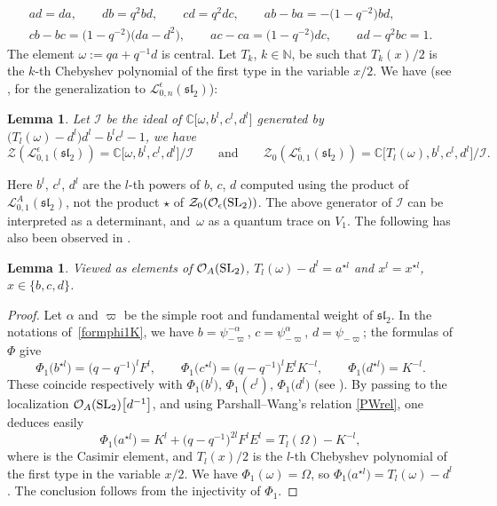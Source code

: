 \documentclass[10pt,a4paper]{amsart}
\numberwithin{equation}{section}
\newtheorem{lem}[teo]{Lemma}
\theoremstyle{definition}
\newcommand{\e}{\epsilon}
\newcommand{\mc}{\mathbb{C}}
\newcommand{\mn}{\mathbb{N}}
\newcommand{\Ll}{{\mathcal L}}
\newcommand{\Oo}{{\mathcal O}}
\begin{document}
\begin{gather}
ad=da ,\qquad db = q^2 bd, \qquad cd = q^2dc, \qquad
 ab-ba = -\big(1-q^{-2}\big)bd,\nonumber \\ cb-bc = \big(1-q^{-2}\big)\big(da-d^2\big),\qquad ac-ca=\big(1-q^{-2}\big)dc,\qquad ad-q^2bc=1. \label{rel01}
\end{gather}
The element $\omega:=qa+q^{-1}d$ is central. Let $T_k$, $k\in \mn$, be such that $T_k(x)/2$ is the $k$-th Chebyshev polynomial of the first type in the variable $x/2$. We have (see \cite[Proposition 7.2]{BR}, for the generalization to $\Ll_{0,n}^\e({\mathfrak{sl}_2})$):
\begin{lem}\label{L01sl2} Let $\mathcal{I}$ be the ideal of $\mc\big[\omega,b^l,c^l,d^l\big]$ generated by $\big(T_l(\omega)-d^l\big)d^l-b^lc^l-1$, we have
\[
\mathcal{Z}(\Ll_{0,1}^\e({\mathfrak{sl}_2})) = \mc\big[\omega,b^l,c^l,d^l\big]/\mathcal{I}\qquad \text{and} \qquad \mathcal{Z}_0(\Ll_{0,1}^\e({\mathfrak{sl}_2})) = \mc\big[T_l(\omega),b^l,c^l,d^l\big]/\mathcal{I}.
\]
\end{lem}
Here $b^l$, $c^l$, $d^l$ are the $l$-th powers of $b$, $c$, $d$ computed using the product of $\Ll_{0,1}^A({\mathfrak{sl}_2})$, not the product $\star$ of $\mathcal{Z}_0(\Oo_\e({\rm SL}_2))$. The above generator of $\mathcal{I}$ can be interpreted as a determinant, and~$\omega$ as a quantum trace on $V_1$. The following has also been observed in \cite{KQ}.

\begin{lem}\label{identZF} Viewed as elements of $\Oo_A({\rm SL}_2)$, $T_l(\omega)-d^l = a^{\star l}$ and $x^l = x^{\star l}$, $x\in \{b,c,d\}$.
\end{lem}
\begin{proof} Let $\alpha$ and $\varpi$ be the simple root and fundamental weight of ${\mathfrak{sl}_2}$. In the notations of~\eqref{formphi1K}, we have $b = \psi^{-\alpha}_{-\varpi}$, $c=\psi^\alpha_{-\varpi}$, $d=\psi_{-\varpi}$; the formulas of $\Phi$ give
\[
\Phi_1\big(b^{\star l}\big) = \big(q-q^{-1}\big)^lF^l , \qquad \Phi_1\big(c^{\star l}\big) = \big(q-q^{-1}\big)^lE^lK^{-l},
\qquad \Phi_1\big(d^{\star l}\big) = K^{-l}.
\]
 These coincide respectively with $\Phi_1\big(b^{l}\big)$, $\Phi_1(c^{l})$, $\Phi_1\big(d^{l}\big)$ (see \cite[equation~(5.3)]{BR}). By passing to the localization $\Oo_A({\rm SL}_2)\big[d^{-1}\big]$, and using Par\-shall--Wang's relation \eqref{PWrel}, one deduces easily
\[
\Phi_1\big(a^{\star l}\big) = K^l + \big(q-q^{-1}\big)^{2l}F^lE^l = T_l(\Omega)-K^{-l},
\]
 where \smash{$\Omega=\big(\e-\e^{-1}\big)^2FE+\e K+\e^{-1}K^{-1}$} is the Casimir element, and $T_l(x)/2$ is the $l$-th Chebyshev polynomial of the first type in the variable $x/2$. We have $\Phi_1(\omega) = \Omega$, so $\Phi_1\big(a^{\star l}\big) = T_l(\omega)-d^l$. The conclusion follows from the injectivity of $\Phi_1$.
\end{proof}
\end{document}

